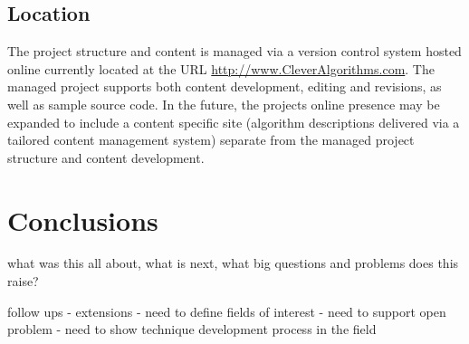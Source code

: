 \documentclass[a4paper, 11pt]{article}
\begin{document}
\subsection{Location}
The project structure and content is managed via a version control system hosted online currently located at the URL \url{http://www.CleverAlgorithms.com}. The managed project supports both content development, editing and revisions, as well as sample source code. In the future, the projects online presence may be expanded to include a content specific site (algorithm descriptions delivered via a tailored content management system) separate from the managed project structure and content development. 

\section{Conclusions}
\label{sec:conclusions}
what was this all about, what is next, what big questions and problems does this raise?


follow ups - extensions
- need to define fields of interest
- need to support open problem
- need to show technique development process in the field
\end{document}
